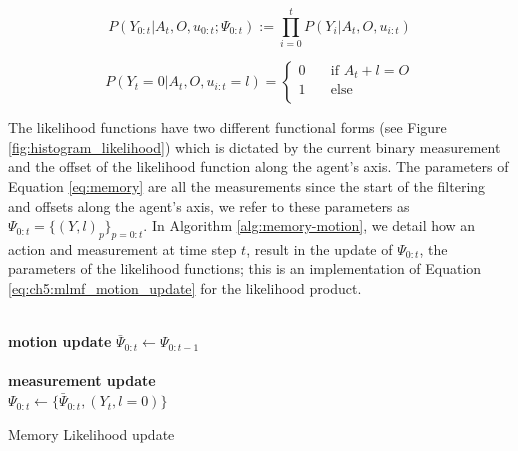\begin{equation}
 P(Y_{0:t}|A_t,O,u_{0:t};\Psi_{0:t}) := \prod_{i=0}^t P(Y_i|A_t,O,u_{i:t}) \label{eq:memory}
\end{equation}

\begin{equation} \label{eq:ch5:liklihood_v2}
P(Y_t=0|A_t,O,u_{i:t}=l) =
  \begin{cases}
    0       & \quad \text{if } A_t + l = O     \\
    1  	    & \quad \text{else}  \\
  \end{cases}
\end{equation}

The likelihood functions have two different functional forms (see Figure \ref{fig:histogram_likelihood}) which is dictated 
by the current binary measurement and the offset of the likelihood function along the agent's axis. The parameters of Equation \ref{eq:memory}
are all the measurements since the start of the filtering and offsets along the agent's axis, we refer to these parameters
as $\Psi_{0:t} = \{(Y,l)_p\}_{p=0:t}$. In Algorithm \ref{alg:memory-motion}, we detail how an action and measurement at 
time step $t$, result in the update of $\Psi_{0:t}$, the parameters of the likelihood functions; this is an implementation of Equation  \ref{eq:ch5:mlmf_motion_update}
for the likelihood product.

\begin{center}
\begin{minipage}{.65\linewidth}

\begin{algorithm}[H]
\label{alg:memory-motion}

\BlankLine
\nonl\hrulefill\\
\nonl\textbf{motion update} $\bar{\Psi}_{0:t} \gets \Psi_{0:t-1}$ \label{alg:ch5:motion_memory}\\
\nonl\hrulefill\\
\nonl\textbf{measurement update}\\
$\Psi_{0:t} \gets \{\bar{\Psi}_{0:t}, (Y_t,l=0)\}$ 
\caption{Memory Likelihood update}

\end{algorithm} 
\end{minipage}
\end{center}


